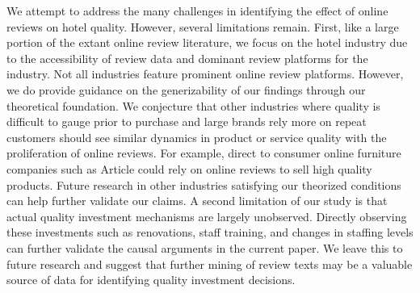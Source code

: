 \documentclass[mksc,blindrev]{informs3} %
\begin{document}
We attempt to address the many challenges in identifying the effect of online reviews on hotel quality. However, several limitations remain. First, like a large portion of the extant online review literature, we focus on the hotel industry due to the accessibility of review data and dominant review platforms for the industry. Not all industries feature prominent online review platforms. However, we do provide guidance on the generizability of our findings through our theoretical foundation. We conjecture that  other industries where quality is difficult to gauge prior to purchase and large brands rely more on repeat customers should see similar dynamics in product or service quality with the proliferation of online reviews. For example, direct to consumer online furniture companies such as Article could rely on online reviews to sell high quality products. Future research in other industries satisfying our theorized conditions can help further validate our claims. A second limitation of our study is that actual quality investment mechanisms are largely unobserved. Directly observing these investments such as renovations, staff training, and changes in staffing levels can further validate the causal arguments in the current paper. We leave this to future research and suggest that further mining of review texts may be a valuable source of data for identifying quality investment decisions.











\end{document}
